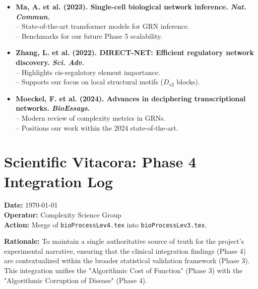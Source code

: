 \documentclass[11pt]{article}
\begin{document}
\begin{itemize}
    \item \textbf{Ma, A. et al. (2023). Single-cell biological network inference. \textit{Nat. Commun.}} \\
    -- State-of-the-art transformer models for GRN inference.\\
    -- Benchmarks for our future Phase 5 scalability.

    \item \textbf{Zhang, L. et al. (2022). DIRECT-NET: Efficient regulatory network discovery. \textit{Sci. Adv.}} \\
    -- Highlights cis-regulatory element importance.\\
    -- Supports our focus on local structural motifs ($D_{v2}$ blocks).

    \item \textbf{Moeckel, F. et al. (2024). Advances in deciphering transcriptional networks. \textit{BioEssays}.} \\
    -- Modern review of complexity metrics in GRNs.\\
    -- Positions our work within the 2024 state-of-the-art.
\end{itemize}

\section{Scientific Vitacora: Phase 4 Integration Log}
\textbf{Date:} \today \\
\textbf{Operator:} Complexity Science Group \\
\textbf{Action:} Merge of \texttt{bioProcessLev4.tex} into \texttt{bioProcessLev3.tex}.

\textbf{Rationale:}
To maintain a single authoritative source of truth for the project's experimental narrative, ensuring that the clinical integration findings (Phase 4) are contextualized within the broader statistical validation framework (Phase 3). This integration unifies the "Algorithmic Cost of Function" (Phase 3) with the "Algorithmic Corruption of Disease" (Phase 4).
\end{document}

